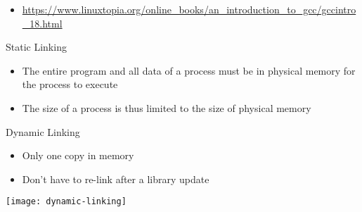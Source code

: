 \begin{itemize}
\item \url{https://www.linuxtopia.org/online_books/an_introduction_to_gcc/gccintro_18.html}
\end{itemize}

\begin{frame}
  \begin{block}{Static Linking}
    \begin{itemize}
    \item The entire program and all data of a process must be in physical memory for the
      process to execute
    \item The size of a process is thus limited to the size of physical memory
    \end{itemize}
  \end{block}
    \begin{center}
  \end{center}
\end{frame}

\begin{frame}
  \begin{minipage}{.35\linewidth}
    \begin{iblock}{Dynamic Linking}
    \begin{itemize}
    \item Only one copy in memory
    \item Don't have to re-link after a library update
    \end{itemize}
  \end{iblock}
  \end{minipage}
  \begin{minipage}{.6\linewidth}
    \texttt{[image: dynamic-linking]}
  \end{minipage}
\end{frame}

